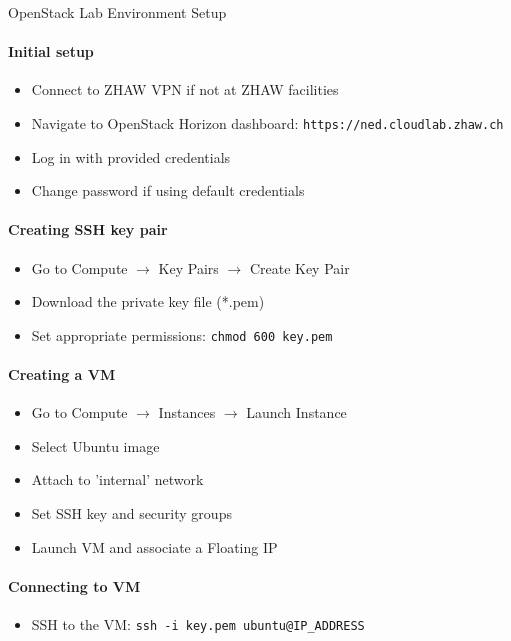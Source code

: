 \begin{KR}{OpenStack Lab Environment Setup}\\
    \paragraph{Initial setup}
    \begin{itemize}
        \item Connect to ZHAW VPN if not at ZHAW facilities
        \item Navigate to OpenStack Horizon dashboard: \texttt{https://ned.cloudlab.zhaw.ch}
        \item Log in with provided credentials
        \item Change password if using default credentials
    \end{itemize}
    
    \paragraph{Creating SSH key pair}
    \begin{itemize}
        \item Go to Compute $\rightarrow$ Key Pairs $\rightarrow$ Create Key Pair
        \item Download the private key file (*.pem)
        \item Set appropriate permissions: \texttt{chmod 600 key.pem}
    \end{itemize}
    
    \paragraph{Creating a VM}
    \begin{itemize}
        \item Go to Compute $\rightarrow$ Instances $\rightarrow$ Launch Instance
        \item Select Ubuntu image
        \item Attach to 'internal' network
        \item Set SSH key and security groups
        \item Launch VM and associate a Floating IP
    \end{itemize}
    
    \paragraph{Connecting to VM}
    \begin{itemize}
        \item SSH to the VM: \texttt{ssh -i key.pem ubuntu@IP\_ADDRESS}
    \end{itemize}
\end{KR}


